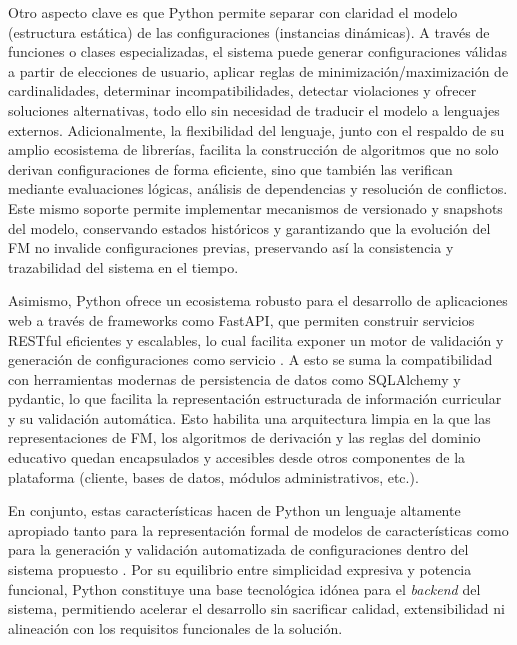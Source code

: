 {{        Otro aspecto clave es que Python permite separar con claridad el modelo 
        (estructura estática) de las configuraciones (instancias dinámicas). A través de 
        funciones o clases especializadas, el sistema puede generar configuraciones válidas a 
        partir de elecciones de usuario, aplicar reglas de minimización/maximización de 
        cardinalidades, determinar incompatibilidades, detectar violaciones y ofrecer 
        soluciones alternativas, todo ello sin necesidad de traducir el modelo a lenguajes 
        externos. Adicionalmente, la flexibilidad del lenguaje, junto con el respaldo de su 
        amplio ecosistema de librerías, facilita la construcción de algoritmos que no solo 
        derivan configuraciones de forma eficiente, sino que también las verifican mediante 
        evaluaciones lógicas, análisis de dependencias y resolución de conflictos. Este mismo 
        soporte permite implementar mecanismos de versionado y snapshots del modelo, conservando 
        estados históricos y garantizando que la evolución del FM no invalide configuraciones 
        previas, preservando así la consistencia y trazabilidad del sistema en el tiempo.

        Asimismo, Python ofrece un ecosistema robusto para el desarrollo de aplicaciones web 
        a través de frameworks como FastAPI, que permiten construir servicios \ac{REST}ful eficientes 
        y escalables, lo cual facilita exponer un motor de validación y generación de configuraciones 
        como servicio \citep{ramirez2019fastapi}. A esto se suma la compatibilidad con herramientas 
        modernas de persistencia de datos como SQLAlchemy y pydantic, lo que facilita la representación 
        estructurada de información curricular y su validación automática. Esto habilita una arquitectura 
        limpia en la que las representaciones de \ac{FM}, los algoritmos de derivación y las reglas 
        del dominio educativo quedan encapsulados y accesibles desde otros componentes de la 
        plataforma (cliente, bases de datos, módulos administrativos, etc.).

        En conjunto, estas características hacen de Python un lenguaje altamente apropiado 
        tanto para la representación formal de modelos de características como para la generación 
        y validación automatizada de configuraciones dentro del sistema propuesto \citep{ray2014large}.
        Por su equilibrio entre simplicidad expresiva y potencia funcional, Python constituye 
        una base tecnológica idónea para el \textit{backend} del sistema, permitiendo acelerar el 
        desarrollo sin sacrificar calidad, extensibilidad ni alineación con los requisitos 
        funcionales de la solución.

}}
